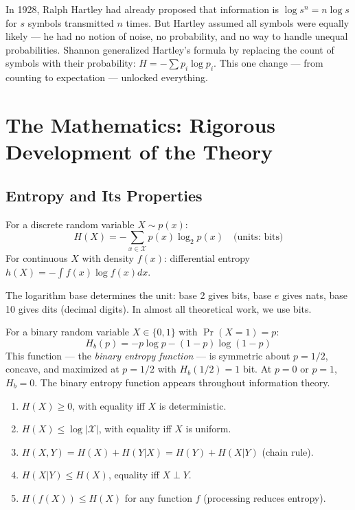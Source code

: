 In 1928, Ralph Hartley had already proposed that information is $\log s^n = n\log s$ for $s$ symbols transmitted $n$ times. But Hartley assumed all symbols were equally likely — he had no notion of noise, no probability, and no way to handle unequal probabilities. Shannon generalized Hartley's formula by replacing the count of symbols with their probability: $H = -\sum p_i \log p_i$. This one change — from counting to expectation — unlocked everything.

\section{The Mathematics: Rigorous Development of the Theory}
\label{sec:information:math}

\subsection{Entropy and Its Properties}
\label{sec:information:entropy}

\begin{definition}[Entropy]
For a discrete random variable $X \sim p(x)$:
\[
H(X) = -\sum_{x \in \mathcal{X}} p(x) \log_2 p(x) \quad \text{(units: bits)}
\]
For continuous $X$ with density $f(x)$: differential entropy $h(X) = -\int f(x) \log f(x) dx$.
\end{definition}

The logarithm base determines the unit: base 2 gives bits, base $e$ gives nats, base 10 gives dits (decimal digits). In almost all theoretical work, we use bits.

\begin{example}
For a binary random variable $X \in \{0,1\}$ with $\Pr(X=1)=p$:
\[
H_b(p) = -p\log p - (1-p)\log(1-p)
\]
This function — the \emph{binary entropy function} — is symmetric about $p=1/2$, concave, and maximized at $p=1/2$ with $H_b(1/2) = 1$ bit. At $p=0$ or $p=1$, $H_b = 0$. The binary entropy function appears throughout information theory.
\end{example}

\begin{theorem}
\label{thm:entropy-properties}
\begin{enumerate}
\item $H(X) \ge 0$, with equality iff $X$ is deterministic.
\item $H(X) \le \log |\mathcal{X}|$, with equality iff $X$ is uniform.
\item $H(X,Y) = H(X) + H(Y|X) = H(Y) + H(X|Y)$ (chain rule).
\item $H(X|Y) \le H(X)$, equality iff $X \perp Y$.
\item $H(f(X)) \le H(X)$ for any function $f$ (processing reduces entropy).
\end{enumerate}
\end{theorem}

